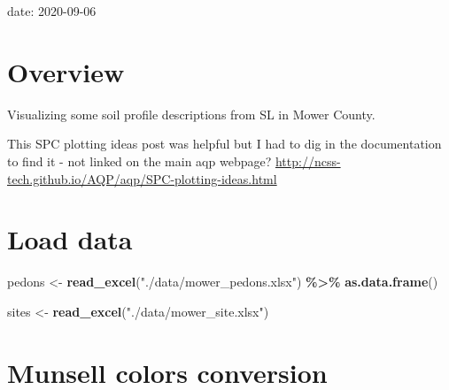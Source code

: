 \documentclass[
]{book}
\newenvironment{Shaded}{\begin{snugshade}}{\end{snugshade}}
\newcommand{\DataTypeTok}[1]{\textcolor[rgb]{0.13,0.29,0.53}{#1}}
\newcommand{\DecValTok}[1]{\textcolor[rgb]{0.00,0.00,0.81}{#1}}
\newcommand{\KeywordTok}[1]{\textcolor[rgb]{0.13,0.29,0.53}{\textbf{#1}}}
\newcommand{\NormalTok}[1]{#1}
\newcommand{\OperatorTok}[1]{\textcolor[rgb]{0.81,0.36,0.00}{\textbf{#1}}}
\newcommand{\OtherTok}[1]{\textcolor[rgb]{0.56,0.35,0.01}{#1}}
\newcommand{\StringTok}[1]{\textcolor[rgb]{0.31,0.60,0.02}{#1}}
\begin{document}
date: 2020-09-06

\hypertarget{overview}{%
\section{Overview}\label{overview}}

Visualizing some soil profile descriptions from SL in Mower County.

This SPC plotting ideas post was helpful but I had to dig in the documentation to find it - not linked on the main aqp webpage?
\url{http://ncss-tech.github.io/AQP/aqp/SPC-plotting-ideas.html}

\begin{Shaded}
\end{Shaded}

\hypertarget{load-data}{%
\section{Load data}\label{load-data}}

\begin{Shaded}
\begin{Highlighting}[]
\NormalTok{pedons \textless{}{-}}\StringTok{ }\KeywordTok{read\_excel}\NormalTok{(}\StringTok{"./data/mower\_pedons.xlsx"}\NormalTok{) }\OperatorTok{\%\textgreater{}\%}\StringTok{ }\KeywordTok{as.data.frame}\NormalTok{()}

\NormalTok{sites \textless{}{-}}\StringTok{ }\KeywordTok{read\_excel}\NormalTok{(}\StringTok{"./data/mower\_site.xlsx"}\NormalTok{)}
\end{Highlighting}
\end{Shaded}

\hypertarget{munsell-colors-conversion}{%
\section{Munsell colors conversion}\label{munsell-colors-conversion}}
\end{document}
